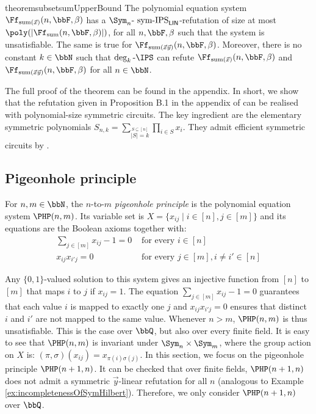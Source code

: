 \documentclass[a4paper,UKenglish,cleveref, autoref, thm-restate]{lipics-v2021}
\newcommand{\symIPSlin}{\text{ \upshape sym-IPS}_{\mathsf{LIN}}}
\begin{document}
\begin{restatable}{theorem}{subsetsumUpperBound}
	\label{thm:symRefutationSubsetSum}
	The polynomial equation system $\Ff_{\text{sum}(\vec x)}(n,\bbF,\beta)$ has a $\Sym_n\text{-}\symIPSlin{}$-refutation of size at most $\poly(| \Ff_{\text{sum}}(n,\bbF,\beta) |)$, for all $n, \bbF, \beta$ such that the system is unsatisfiable.
	The same is true for $\Ff_{\text{sum}(\vec x \vec y)}(n,\bbF,\beta)$.
	 Moreover, there is no constant $k \in \bbN$ such that $\deg_k\text{-}\IPS$ can refute $\Ff_{\text{sum}(\vec x)}(n,\bbF,\beta)$ and $\Ff_{\text{sum}(\vec x \vec y)}(n,\bbF,\beta)$ for all $n \in \bbN$.
\end{restatable}	
The full proof of the theorem can be found in the appendix. In short, we show that the refutation given in Proposition B.1 in the appendix of \cite{lowerbounds_IPS} can be realised with polynomial-size symmetric circuits. The key ingredient are the elementary symmetric polynomials $S_{n,k} = \sum_{\stackrel{S \subseteq [n]}{|S| = k}} \prod_{i \in S} x_i$. They admit efficient symmetric circuits by \cite{shpilka2001depth}.


\subsection{Pigeonhole principle}


\begin{definition}
	For $n,m \in \bbN$, the $n$-to-$m$ \emph{pigeonhole principle} is the polynomial equation system $\PHP(n,m)$. Its variable set is $X = \{x_{ij} \mid i \in [n], j \in [m]\}$ and its equations are the Boolean axioms together with:
	\begin{align*}
		\sum_{j \in [m]} x_{ij} - 1 = 0&\text{    for every } i \in [n]\\
		x_{ij}x_{i'j} = 0& \text{    for every } j \in [m], i \neq i' \in [n]
	\end{align*}
\end{definition}	
Any $\{0,1\}$-valued solution to this system gives an injective function from $[n]$ to $[m]$ that maps $i$ to $j$ if $x_{ij} = 1$.  The equation $\sum_{j \in [m]} x_{ij} - 1 = 0$ guarantees that each value $i$ is mapped to exactly one $j$ and $x_{ij}x_{i'j}  = 0$ ensures that distinct $i$ and $i'$ are not mapped to the same value.
Whenever $n > m$, $\PHP(n,m)$ is thus unsatisfiable. This is the case over $\bbQ$, but also over every finite field.
It is easy to see that $\PHP(n,m)$ is invariant under $\Sym_n \times \Sym_m$, where the group action on $X$ is: $(\pi,\sigma)(x_{ij}) = x_{\pi(i)\sigma(j)}$. In this section, we focus on the pigeonhole principle $\PHP(n+1,n)$. It can be checked that over finite fields, $\PHP(n+1,n)$ does not admit a symmetric $\vec{y}$-linear refutation for all $n$ (analogous to Example \ref{ex:incompletenessOfSymHilbert}). Therefore, we only consider $\PHP(n+1,n)$ over $\bbQ$.
\end{document}
